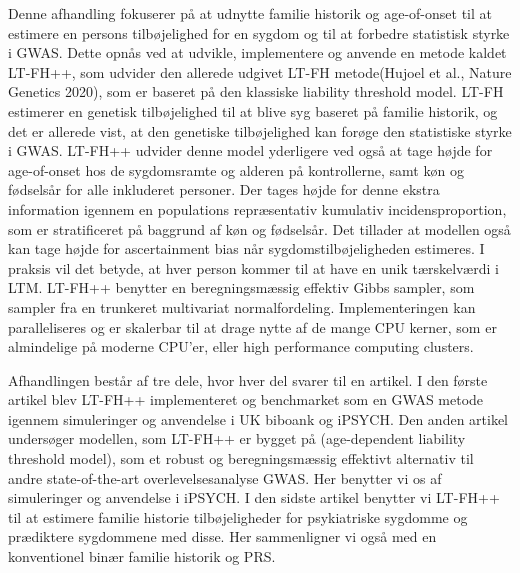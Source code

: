 Denne afhandling fokuserer på at udnytte familie historik og age-of-onset til at estimere en persons tilbøjelighed for en sygdom og til at forbedre statistisk styrke i GWAS. Dette opnås ved at udvikle, implementere og anvende en metode kaldet LT-FH++, som udvider den allerede udgivet LT-FH metode(Hujoel et al., Nature Genetics 2020), som er baseret på den klassiske liability threshold model. LT-FH estimerer en genetisk tilbøjelighed til at blive syg baseret på familie historik, og det er allerede vist, at den genetiske tilbøjelighed kan forøge den statistiske styrke i GWAS. LT-FH++ udvider denne model yderligere ved også at tage højde for age-of-onset hos de sygdomsramte og alderen på kontrollerne, samt køn og fødselsår for alle inkluderet personer. Der tages højde for denne ekstra information igennem en populations repræsentativ kumulativ incidensproportion, som er stratificeret på baggrund af køn og fødselsår. Det tillader at modellen også kan tage højde for ascertainment bias når sygdomstilbøjeligheden estimeres. I praksis vil det betyde, at hver person kommer til at have en unik tærskelværdi i LTM. LT-FH++ benytter en beregningsmæssig effektiv Gibbs sampler, som sampler fra en trunkeret multivariat normalfordeling. Implementeringen kan paralleliseres og er skalerbar til at drage nytte af de mange CPU kerner, som er almindelige på moderne CPU'er, eller high performance computing clusters.

Afhandlingen består af tre dele, hvor hver del svarer til en artikel. I den første artikel blev LT-FH++ implementeret og benchmarket som en GWAS metode igennem simuleringer og anvendelse i UK biboank og iPSYCH. Den anden artikel undersøger modellen, som LT-FH++ er bygget på (age-dependent liability threshold model), som et robust og beregningsmæssig effektivt alternativ til andre state-of-the-art overlevelsesanalyse GWAS. Her benytter vi os af simuleringer og anvendelse i iPSYCH. I den sidste artikel benytter vi LT-FH++ til at estimere familie historie tilbøjeligheder for psykiatriske sygdomme og prædiktere sygdommene med disse. Her sammenligner vi også med en konventionel binær familie historik og PRS.